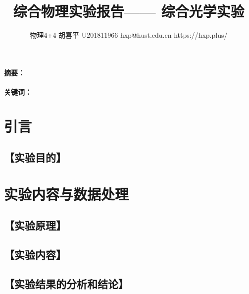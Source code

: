 \documentclass{ctexart}
\date{}
\newcommand{\generatetitle}[6]{\title{\zihao{3}\heiti#1} \author{#2 \quad
\quad #3 \quad\quad #4 \quad\quad #5 \quad\quad #6} \maketitle\thispagestyle{fancy}}
\let\oldsubsection\subsection
\renewcommand{\subsection}[1]{\oldsubsection{\!\!\!\!\!\!【#1】}}
\let\oldparagraph\paragraph
\renewcommand{\paragraph}[1]{\oldparagraph{#1：\!\!\!\!\!\!}}
\begin{document}
    \generatetitle{综合物理实验报告——
    综合光学实验}{物理4+4}{胡喜平}{U201811966}{hxp@hust.edu.cn}{https://hxp.plus/}

    \paragraph{摘要}

    \paragraph{关键词}

    \section{引言}

    \subsection{实验目的}

    \section{实验内容与数据处理}

    \subsection{实验原理}

    \subsection{实验内容}

    \subsection{实验结果的分析和结论}
\end{document}
